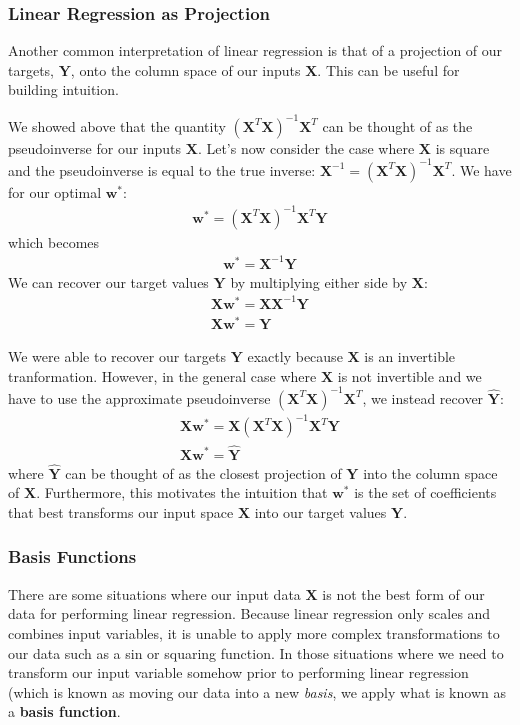 \subsubsection{Linear Regression as Projection}
Another common interpretation of linear regression is that of a projection of our targets, $\textbf{Y}$, onto the column space of our inputs $\textbf{X}$. This can be useful for building intuition.

We showed above that the quantity $(\textbf{X}^{T}\textbf{X})^{-1}\textbf{X}^{T}$ can be thought of as the pseudoinverse for our inputs $\textbf{X}$. Let's now consider the case where $\textbf{X}$ is square and the pseudoinverse is equal to the true inverse: $\textbf{X}^{-1} = (\textbf{X}^{T}\textbf{X})^{-1}\textbf{X}^{T}$. We have for our optimal $\textbf{w}^{*}$:
\begin{align*}
    \textbf{w}^{*} = (\textbf{X}^{T}\textbf{X})^{-1}\textbf{X}^{T}\textbf{Y}
\end{align*}
which becomes
\begin{align*}
    \textbf{w}^{*} = \textbf{X}^{-1}\textbf{Y}
\end{align*}
We can recover our target values $\textbf{Y}$ by multiplying either side by $\textbf{X}$:
\begin{align*}
    \textbf{X}\textbf{w}^{*} = \textbf{X}\textbf{X}^{-1}\textbf{Y} \\
    \textbf{X}\textbf{w}^{*} = \textbf{Y}
\end{align*}

We were able to recover our targets $\textbf{Y}$ exactly because $\textbf{X}$ is an invertible tranformation. However, in the general case where $\textbf{X}$ is not invertible and we have to use the approximate pseudoinverse $(\textbf{X}^{T}\textbf{X})^{-1}\textbf{X}^{T}$, we instead recover $\hat{\textbf{Y}}$:
\begin{align*}
    \textbf{X}\textbf{w}^{*} = \textbf{X}(\textbf{X}^{T}\textbf{X})^{-1}\textbf{X}^{T}\textbf{Y} \\
    \textbf{X}\textbf{w}^{*} = \hat{\textbf{Y}}
\end{align*}
where $\hat{\textbf{Y}}$ can be thought of as the closest projection of $\textbf{Y}$ into the column space of $\textbf{X}$. Furthermore, this motivates the intuition that $\textbf{w}^{*}$ is the set of coefficients that best transforms our input space $\textbf{X}$ into our target values $\textbf{Y}$.

\subsubsection{Basis Functions}
There are some situations where our input data $\textbf{X}$ is not the best form of our data for performing linear regression. Because linear regression only scales and combines input variables, it is unable to apply more complex transformations to our data such as a sin or squaring function. In those situations where we need to transform our input variable somehow prior to performing linear regression (which is known as moving our data into a new \textit{basis}, we apply what is known as a \textbf{basis function}.

